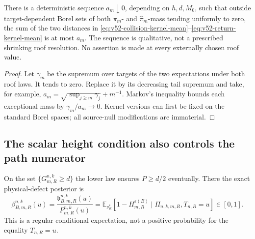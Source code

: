 \begin{corollary}
\label{cor:v52-full-roof-sets}
There is a deterministic sequence $a_m\downarrow0$, depending on
$h,d,M_0$, such that outside target-dependent Borel sets of both
$\pi_m$- and $\widehat\pi_m$-mass tending uniformly to zero, the sum
of the two distances in
\eqref{eq:v52-collision-kernel-mean}--\eqref{eq:v52-return-kernel-mean}
is at most $a_m$. The sequence is qualitative, not a prescribed
shrinking roof resolution. No assertion is made at every externally
chosen roof value.
\end{corollary}
\begin{proof}
Let $\gamma_m$ be the supremum over targets of the two expectations
under both roof laws. It tends to zero. Replace it by its decreasing
tail supremum and take, for example,
$a_m=\sqrt{\sup_{j\ge m}\gamma_j}+m^{-1}$.
Markov's inequality bounds each exceptional mass by
$\gamma_m/a_m\to0$. Kernel versions can first be fixed on the
standard Borel spaces; all source-null modifications are immaterial.
\end{proof}

\subsection{The scalar height condition also controls the path numerator}
On the set $\{G_{m,R}^{n,k}\ge d\}$ the lower law ensures
$P\ge d/2$ eventually. There the exact physical-defect posterior is
\begin{equation}\label{eq:v52-physical-posterior}
 \beta_{B,m,R}^{n,k}(u)=\frac{\mathfrak b_{B,m,R}^{n,k}(u)}
                              {P_{m,R}^{n,k}(u)}
 =\mathbb E_{\nu_R^*}[1-H_{m,R}^{\varepsilon(B)}
                       \mid \Pi_{n,k,m,R},T_{n,R}=u]\in[0,1].
\end{equation}
This is a regular conditional expectation, not a positive probability
for the equality $T_{n,R}=u$.

